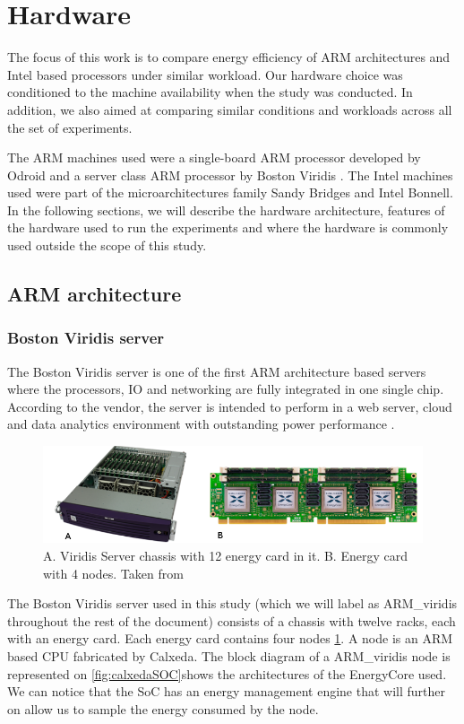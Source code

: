 \section{Hardware}
The focus of this work is to compare energy efficiency of ARM architectures and Intel based 
processors under similar workload. Our hardware choice  was conditioned to the
machine availability when the study was conducted. In addition, we also aimed
at comparing similar conditions and workloads across all the set of experiments. 

The ARM machines used were a single-board ARM processor developed by Odroid
\cite{ODROID_XU3} and a server class ARM processor by Boston 
Viridis \cite{VIRIDIS}. The Intel machines used were part of the microarchitectures family Sandy Bridges and Intel Bonnell. In the following sections, we will describe the hardware architecture, features of the hardware used to run the experiments and where the hardware is commonly used outside the scope of this study. 

\subsection{ARM architecture}
\subsubsection{Boston Viridis server}

The Boston Viridis server is one of the first ARM architecture based servers
where the processors, IO and networking are fully integrated in one single chip.
According to the vendor, the server is intended to perform in a web server,
cloud and data analytics environment with outstanding power performance \cite{VIRIDIS}.

\begin{figure}[h!]
  \centering
    \includegraphics[width=\textwidth]{"img/viridis&SoC"}
    \caption{A. Viridis Server chassis with 12 energy card in it. B. Energy card
with 4 nodes. Taken from \cite{VIRIDIS}}
    \label{fig:viridis&SoC}
\end{figure}


The Boston Viridis server used in this study (which we will label as ARM\_viridis throughout the rest of the document) consists of a chassis with twelve racks, each with an
energy card. Each energy card contains four nodes \ref{fig:viridis&SoC}. 
A node is an ARM based CPU fabricated by Calxeda. The block diagram of a ARM\_viridis node is represented on \ref{fig:calxedaSOC}shows the architectures of the EnergyCore used. We can notice that the SoC has an energy management engine that will further on allow us to sample the energy consumed by the node.  

